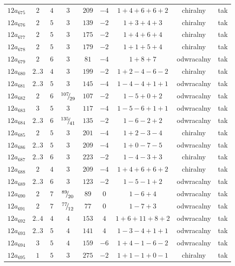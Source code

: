 \begin{longtable}{ccccccccc}
$12a_{675}$ & $2$ & $4$ & $3$ & $209$ & $-4$ & $1+4+6+6+2$ & chiralny & tak \\
$12a_{676}$ & $2$ & $5$ & $3$ & $139$ & $-2$ & $1+3+4+3$ & chiralny & tak \\
$12a_{677}$ & $2$ & $5$ & $3$ & $175$ & $-2$ & $1+4+6+4$ & chiralny & tak \\
$12a_{678}$ & $2$ & $5$ & $3$ & $179$ & $-2$ & $1+1+5+4$ & chiralny & tak \\
$12a_{679}$ & $2$ & $6$ & $3$ & $81$ & $-4$ & $1+8+7$ & odwracalny & tak \\
$12a_{680}$ & $2..3$ & $4$ & $3$ & $199$ & $-2$ & $1+2-4-6-2$ & chiralny & tak \\
$12a_{681}$ & $2..3$ & $5$ & $3$ & $145$ & $-4$ & $1-4-4+1+1$ & odwracalny & tak \\
$12a_{682}$ & $2$ & $6$ & ${}^{107}{\mskip -5mu/\mskip -3mu}_{29}$ & $107$ & $-2$ & $1-5+0+2$ & odwracalny & tak \\
$12a_{683}$ & $3$ & $5$ & $3$ & $117$ & $-4$ & $1-5-6+1+1$ & odwracalny & tak \\
$12a_{684}$ & $2..3$ & $6$ & ${}^{135}{\mskip -5mu/\mskip -3mu}_{41}$ & $135$ & $-2$ & $1-6-2+2$ & odwracalny & tak \\
$12a_{685}$ & $2$ & $5$ & $3$ & $201$ & $-4$ & $1+2-3-4$ & chiralny & tak \\
$12a_{686}$ & $2..3$ & $5$ & $3$ & $209$ & $-4$ & $1+0-7-5$ & odwracalny & tak \\
$12a_{687}$ & $2..3$ & $6$ & $3$ & $223$ & $-2$ & $1-4-3+3$ & chiralny & tak \\
$12a_{688}$ & $2$ & $4$ & $3$ & $209$ & $-4$ & $1+4+6+6+2$ & chiralny & tak \\
$12a_{689}$ & $2..3$ & $6$ & $3$ & $123$ & $-2$ & $1-5-1+2$ & odwracalny & tak \\
$12a_{690}$ & $2$ & $7$ & ${}^{89}{\mskip -5mu/\mskip -3mu}_{20}$ & $89$ & $0$ & $1-6+4$ & odwracalny & tak \\
$12a_{691}$ & $2$ & $7$ & ${}^{77}{\mskip -5mu/\mskip -3mu}_{12}$ & $77$ & $0$ & $1-7+3$ & odwracalny & tak \\
$12a_{692}$ & $2..4$ & $4$ & $4$ & $153$ & $4$ & $1+6+11+8+2$ & odwracalny & tak \\
$12a_{693}$ & $2..3$ & $5$ & $4$ & $141$ & $4$ & $1-3-4+1+1$ & odwracalny & tak \\
$12a_{694}$ & $3$ & $5$ & $4$ & $159$ & $-6$ & $1+4-1-6-2$ & odwracalny & tak \\
$12a_{695}$ & $1$ & $5$ & $3$ & $275$ & $-2$ & $1+1-1+0-1$ & chiralny & tak \\

\end{longtable}
